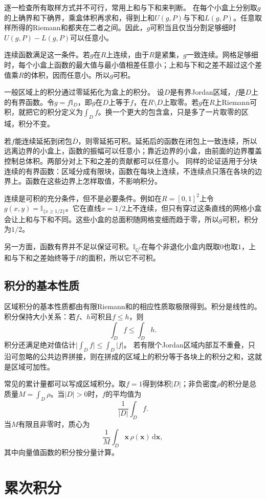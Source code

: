 逐一检查所有取样方式并不可行，常用上和与下和来判断。
在每个小盒上分别取$g$的上确界和下确界，乘盒体积再求和，得到上和$U(g,P)$与下和$L(g,P)$。任意取样所得的Riemann和都夹在二者之间。因此，$g$可积当且仅当分割足够细时$U(g,P)-L(g,P)$可以任意小。

连续函数满足这一条件。若$g$在$R$上连续，由于$R$是紧集，$g$一致连续。网格足够细时，每个小盒上函数的最大值与最小值相差任意小；上和与下和之差不超过这个差值乘$R$的体积，因而任意小。所以$g$可积。

一般区域上的积分通过零延拓化为盒上的积分。
设$D$是有界Jordan区域，$f$是$D$上的有界函数。令$g=f\mathbb I_D$，即$g$在$D$上等于$f$，在$R\setminus D$上取零。若$g$在$R$上Riemann可积，就把它的积分定义为$\int_D f$。换一个更大的包含盒，只是多了一片取零的区域，积分不变。

若$f$能连续延拓到闭包$\overline D$，则零延拓可积。延拓后的函数在闭包上一致连续，所以远离边界的小盒上，函数的振幅可以任意小；靠近边界的小盒，由前面的边界覆盖控制总体积。两部分对上下和之差的贡献都可以任意小。
同样的论证适用于分块连续的有界函数：区域分成有限块，函数在每块上连续，不连续点只落在各块的边界上。函数在这些边界上怎样取值，不影响积分。

连续是可积的充分条件，但不是必要条件。例如在$R=[0,1]^2$上令$g(x,y)=\mathbb I_{\{x\geq1/2\}}$。它在直线$x=1/2$上不连续，但只有穿过这条直线的网格小盒会让上和与下和不同。这些小盒的总面积随网格变细而趋于零，所以$g$可积，积分为$1/2$。

另一方面，函数有界并不足以保证可积。$\mathbb I_{\mathbb Q^2}$在每个非退化小盒内既取$0$也取$1$，上和与下和之差始终等于$R$的面积，所以它不可积。

\subsection{积分的基本性质}

区域积分的基本性质都由有限Riemann和的相应性质取极限得到。积分是线性的。积分保持大小关系：若$f$、$h$可积且$f\leq h$，则
\[
 \int_D f\leq\int_D h.
\]
积分还满足绝对值估计$\bigl|\int_D f\bigr|\leq\int_D|f|$。
若有限个Jordan区域内部互不重叠，只沿可忽略的公共边界拼接，则在拼成的区域上的积分等于各块上的积分之和，这就是区域可加性。

常见的累计量都可以写成区域积分。取$f=1$得到体积$|D|$；非负密度$\rho$的积分是总质量$M=\int_D\rho$。当$|D|>0$时，$f$的平均值为
\[
 \frac1{|D|}\int_D f.
\]
当$M$有限且非零时，质心为
\[
 \frac1M\int_D\bm x\,\rho(\bm x)\,\mathrm d\bm x,
\]
其中向量值函数的积分按分量计算。

\section{累次积分}

